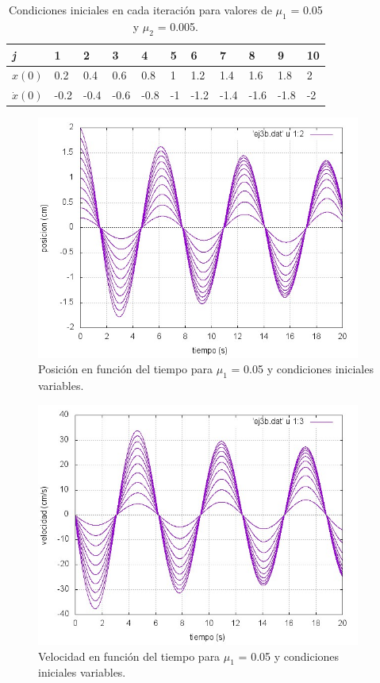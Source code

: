 \documentclass[a4paper,12pt]{article}
\begin{document}
\begin{itemize}
\begin{table}
	\centering
    \begin{tabular}{| l | l | l | l | l | l | l | l | l | l |p{1cm}|}
    \hline
    \textit{j} & 1 & 2 & 3 & 4 & 5 & 6 & 7 & 8 & 9 & 10 \\ \hline
    $x(0)$ & 0.2 & 0.4 & 0.6 & 0.8 & 1 & 1.2 & 1.4 & 1.6 & 1.8 & 2 \\ \hline
    $\dot{x}(0)$ & -0.2 & -0.4 & -0.6 & -0.8 & -1 & -1.2 & -1.4 & -1.6 & -1.8 & -2 \\
    \hline
    \end{tabular}
    \caption{Condiciones iniciales en cada iteraci\'on para valores de $\mu_1$ = 0.05 y $\mu_2$ = 0.005.}
    \label{table:2}
\end{table}



\begin{figure}[H]
\begin{center}
\includegraphics[height=8cm]{grafico_ej3b_xVSt.jpg}
\caption[width=5cm]{Posici\'on en funci\'on del tiempo para $\mu_1$ = 0.05 y condiciones iniciales variables.}
\end{center}
\end{figure}

\begin{figure}[H]
\begin{center}
\includegraphics[height=8cm]{grafico_ej3b_vVSt.jpg}
\caption[width=5cm]{Velocidad en funci\'on del tiempo para $\mu_1$ = 0.05 y condiciones iniciales variables.}
\end{center}
\end{figure}


\end{itemize}
\end{document}
